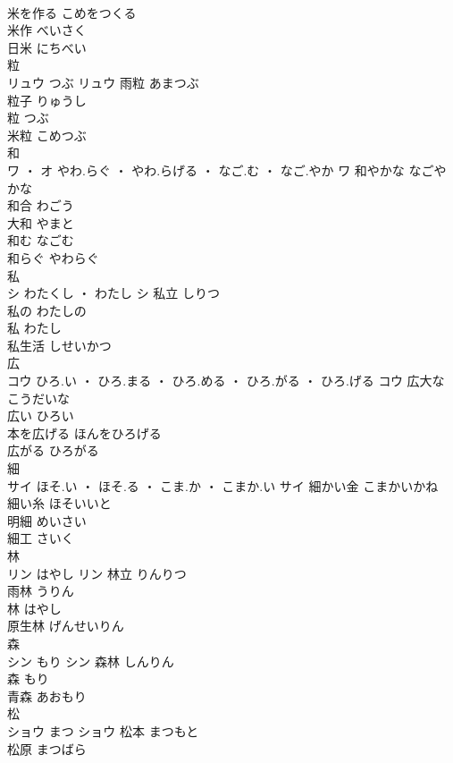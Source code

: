\documentclass[8pt]{extreport}
\begin{document}
\begin{CJK}{UTF8}{min}
\\	米を作る	こめをつくる	
\\	米作	べいさく	
\\	日米	にちべい	
\\	粒	
\\	リュウ	つぶ	リュウ	雨粒	あまつぶ	
\\	粒子	りゅうし	
\\	粒	つぶ	
\\	米粒	こめつぶ	
\\	和	
\\	ワ ・ オ	やわ.らぐ ・ やわ.らげる ・ なご.む ・ なご.やか	ワ	和やかな	なごやかな	
\\	和合	わごう	
\\	大和	やまと	
\\	和む	なごむ	
\\	和らぐ	やわらぐ	
\\	私	
\\	シ	わたくし ・ わたし	シ	私立	しりつ	
\\	私の	わたしの	
\\	私	わたし	
\\	私生活	しせいかつ	
\\	広	
\\	コウ	ひろ.い ・ ひろ.まる ・ ひろ.める ・ ひろ.がる ・ ひろ.げる	コウ	広大な	こうだいな	
\\	広い	ひろい	
\\	本を広げる	ほんをひろげる	
\\	広がる	ひろがる	
\\	細	
\\	サイ	ほそ.い ・ ほそ.る ・ こま.か ・ こまか.い	サイ	細かい金	こまかいかね	
\\	細い糸	ほそいいと	
\\	明細	めいさい	
\\	細工	さいく	
\\	林	
\\	リン	はやし	リン													林立	りんりつ	
\\	雨林	うりん	
\\	林	はやし	
\\	原生林	げんせいりん	
\\	森	
\\	シン	もり	シン	森林	しんりん	
\\	森	もり	
\\	青森	あおもり	
\\	松	
\\	ショウ	まつ	ショウ													松本	まつもと	
\\	松原	まつばら	

\end{CJK}
\end{document}
